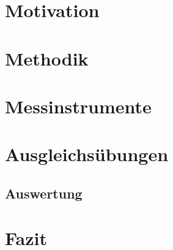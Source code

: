 \documentclass[11pt, titlepage, twoside]{scrartcl}
\numberwithin{figure}{section}
\numberwithin{table}{section}
\numberwithin{equation}{section}
\begin{document}
   \section{Motivation}
   

   \section{Methodik}
   

   \section{Messinstrumente}
   

   \section{Ausgleichsübungen}
   

   \subsection{Auswertung}
   

   \section{Fazit}
   


   \nocite{*}
   \printbibliography
   
\end{document}
